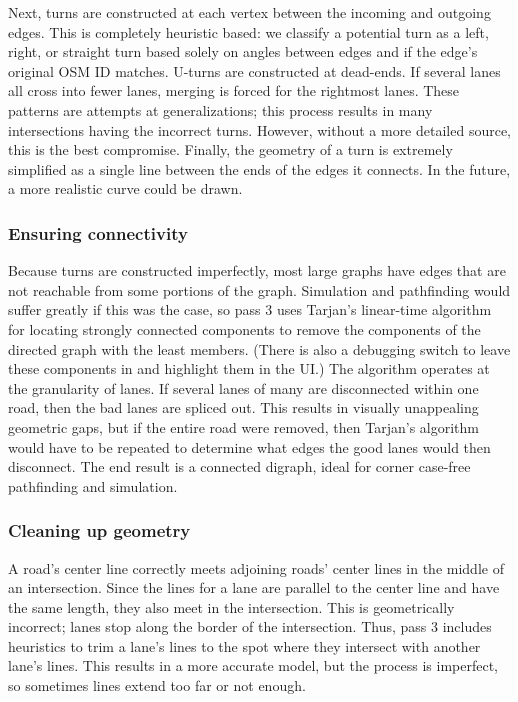 \documentclass[12pt]{article}
\begin{document}
Next, turns are constructed at each vertex between the incoming and outgoing
edges. This is completely heuristic based: we classify a potential turn as a
left, right, or straight turn based solely on angles between edges and if the
edge's original OSM ID matches. U-turns are constructed at dead-ends. If several
lanes all cross into fewer lanes, merging is forced for the rightmost lanes.
These patterns are attempts at generalizations; this process results in many
intersections having the incorrect turns. However, without a more detailed
source, this is the best compromise. Finally, the geometry of a turn is
extremely simplified as a single line between the ends of the edges it connects.
In the future, a more realistic curve could be drawn.

\subsubsection{Ensuring connectivity}

Because turns are constructed imperfectly, most large graphs have edges that are
not reachable from some portions of the graph. Simulation and pathfinding would
suffer greatly if this was the case, so pass 3 uses Tarjan's linear-time
algorithm for locating strongly connected components to remove the components of
the directed graph with the least members. (There is also a debugging switch to
leave these components in and highlight them in the UI.) The algorithm operates
at the granularity of lanes. If several lanes of many are disconnected within
one road, then the bad lanes are spliced out. This results in visually
unappealing geometric gaps, but if the entire road were removed, then Tarjan's
algorithm would have to be repeated to determine what edges the good lanes would
then disconnect. The end result is a connected digraph, ideal for corner
case-free pathfinding and simulation.

\subsubsection{Cleaning up geometry}

A road's center line correctly meets adjoining roads' center lines in the middle
of an intersection. Since the lines for a lane are parallel to the center line
and have the same length, they also meet in the intersection. This is
geometrically incorrect; lanes stop along the border of the intersection. Thus,
pass 3 includes heuristics to trim a lane's lines to the spot where they
intersect with another lane's lines. This results in a more accurate model, but
the process is imperfect, so sometimes lines extend too far or not enough.
\end{document}
